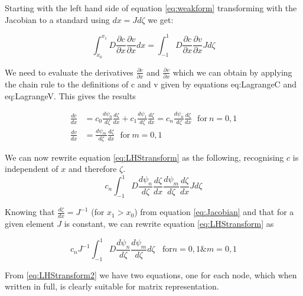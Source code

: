 \documentclass[11pt]{article}
\begin{document}
Starting with the left hand side of equation \ref{eq:weakform} transforming with the Jacobian to a standard using $dx = Jd\zeta$ we get:

\begin{equation} \label{eq:LHStransform}
\int_{x_0}^{x_{1}} D \frac{\partial c}{\partial x}  \frac{\partial v}{\partial x}  dx =  \int_{-1}^{1} D \frac{\partial c}{\partial x}  \frac{\partial v}{\partial x} J d\zeta
\end{equation}

We need to evaluate the derivatives $\frac{\partial c}{\partial x}$ and $ \frac{\partial v}{\partial x}$ which we can obtain by applying the chain rule to the definitions of c and v given by equations {eq:LagrangeC} and {eq:LagrangeV}. This gives the results

\begin{subequations}
\label{eq:LagrangeD}
\begin{align}
\frac{dc}{dx} &= c_{0}\frac{d\psi_{0}}{d\zeta}\frac{d\zeta}{dx} + c_1\frac{d\psi_{1}}{d\zeta}\frac{d\zeta}{dx} = c_n\frac{d\psi_{n}}{d\zeta}\frac{d\zeta}{dx} \label{eq:LagrangeDC} \ \ \ \text{for} \ n =0,1\\
\frac{dv}{dx} &= \frac{d\psi_{m}}{d\zeta}\frac{d\zeta}{dx} \ \ \ \text{for} \ m =0,1 \label{eq:LagrangeDV} 
\end{align}
\end{subequations}

We can now rewrite equation \ref{eq:LHStransform} as the following, recognising $c$ is independent of $x$ and therefore $\zeta$.
\begin{equation} \label{eq:LHStransform}
 c_n\int_{-1}^{1} D \frac{d\psi_{n}}{d\zeta}\frac{d\zeta}{dx} \frac{d\psi_{m}}{d\zeta}\frac{d\zeta}{dx} J d\zeta
\end{equation}

Knowing that $\frac{d\zeta}{dx} = J^{-1}$ (for $x_1 > x_0$) from equation \ref{eq:Jacobian} and that for a given element $J$ is constant, we can rewrite equation \ref{eq:LHStransform} as

\begin{equation} \label{eq:LHStransform2}
 c_nJ^{-1}\int_{-1}^{1} D \frac{d\psi_{n}}{d\zeta}\frac{d\psi_{m}}{d\zeta} d\zeta \ \ \ \ \text{for} n= 0,1 \& m = 0,1
\end{equation}


From \ref{eq:LHStransform2} we have two equations, one for each node, which when written in full, is clearly suitable for matrix representation.
\end{document}
